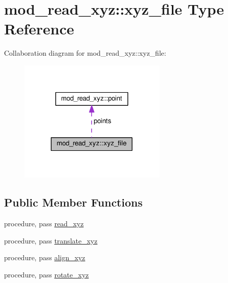 \hypertarget{structmod__read__xyz_1_1xyz__file}{}\section{mod\+\_\+read\+\_\+xyz\+:\+:xyz\+\_\+file Type Reference}
\label{structmod__read__xyz_1_1xyz__file}


Collaboration diagram for mod\+\_\+read\+\_\+xyz\+:\+:xyz\+\_\+file\+:\nopagebreak
\begin{figure}[H]
\begin{center}
\leavevmode
\includegraphics[width=200pt]{structmod__read__xyz_1_1xyz__file__coll__graph}
\end{center}
\end{figure}
\subsection*{Public Member Functions}
\begin{DoxyCompactItemize}
\item 
procedure, pass \hyperlink{structmod__read__xyz_1_1xyz__file_aa11ebdf72bd3cefbb34be37cf4e7d7c3}{read\+\_\+xyz}
\item 
procedure, pass \hyperlink{structmod__read__xyz_1_1xyz__file_a5b5040936c65ef3bffa575589d3832e1}{translate\+\_\+xyz}
\item 
procedure, pass \hyperlink{structmod__read__xyz_1_1xyz__file_ad6d787ad066497b2f341190475842597}{align\+\_\+xyz}
\item 
procedure, pass \hyperlink{structmod__read__xyz_1_1xyz__file_a21ba9b56ce2408f5a61646e39cbcf285}{rotate\+\_\+xyz}
\end{DoxyCompactItemize}
